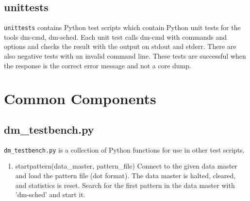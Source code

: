 \documentclass[12pt,a4paper]{report}
\begin{document}
\section{unittests}
\texttt{unittests} contains Python test scripts which contain Python unit tests for the tools dm-cmd, dm-sched. Each unit test calls dm-cmd
with commands and options and checks the result with the output on stdout and stderr. There are also negative tests with an invalid command
line. These tests are successful when the response is the correct error message and not a core dump.
\chapter{Common Components}
\section{dm\_testbench.py}
\texttt{dm\_testbench.py} is a collection of Python functions for use in other test scripts.
\begin{enumerate}
\item startpattern(data\_master, pattern\_file)
    Connect to the given data master and load the pattern file (dot format).
    The data master is halted, cleared, and statistics is reset.
    Search for the first pattern in the data master with 'dm-sched' and start it.
\end{enumerate}
\end{document}

